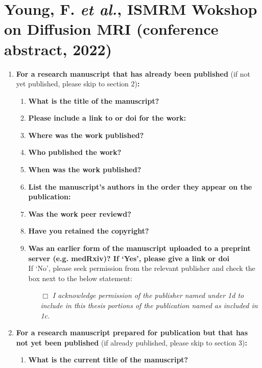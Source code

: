 {\section*{Young, F. \textit{et al.}, ISMRM Wokshop on Diffusion MRI (conference abstract, 2022)}
\begin{enumerate}[leftmargin=*,label={\bfseries\arabic*.}]\itemsep0em
	\item \textbf{For a research manuscript that has already been published} (if not yet published, please skip to section 2)\textbf{:}
	\begin{enumerate}[label={\alph*)}]\itemsep0em
	\item \textbf{What is the title of the manuscript?}

	\item \textbf{Please include a link to or doi for the work:}

	\item \textbf{Where was the work published?}

	\item \textbf{Who published the work?}

	\item \textbf{When was the work published?}

	\item \textbf{List the manuscript's authors in the order they appear on the publication:}

	\item \textbf{Was the work peer reviewd?}

	\item \textbf{Have you retained the copyright?}

	\item \textbf{Was an earlier form of the manuscript uploaded to a preprint server (e.g. medRxiv)? If ‘Yes’, please give a link or doi}
	\\
	If ‘No’, please seek permission from the relevant publisher and check the box next to the below statement:
\begin{itemize}\itemsep0em
\item[$\Box$] {\itshape I acknowledge permission of the publisher named under 1d to include in this thesis portions of the publication named as included in 1c.}
\end{itemize}
%
\end{enumerate}
%
\item \textbf{For a research manuscript prepared for publication but that has not yet been published} (if already published, please skip to section 3)\textbf{:}
%
\begin{enumerate}[label={\alph*)}]\itemsep0em
	\item \textbf{What is the current title of the manuscript?}


\end{enumerate}
\end{enumerate}}
